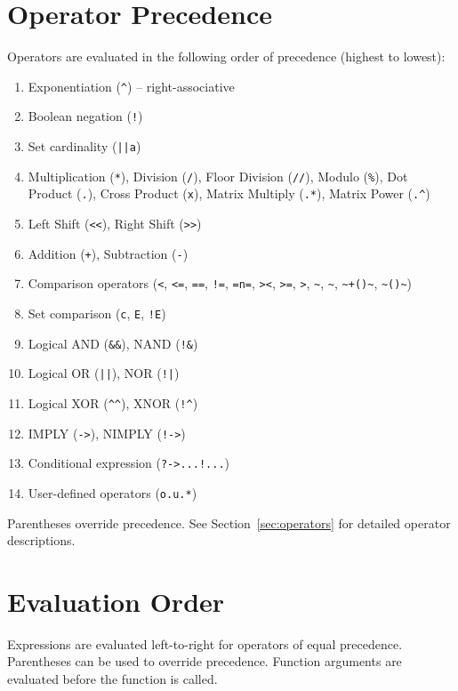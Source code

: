 \documentclass{report}
\begin{document}
\section{Operator Precedence}
Operators are evaluated in the following order of precedence (highest to lowest):
\begin{enumerate}
\item Exponentiation (\texttt{\^{}}) -- right-associative
\item Boolean negation (\texttt{!})
\item Set cardinality (\texttt{||a})
\item Multiplication (\texttt{*}), Division (\texttt{/}), Floor Division (\texttt{//}), Modulo (\texttt{\%}), Dot Product (\texttt{.}), Cross Product (\texttt{x}), Matrix Multiply (\texttt{.*}), Matrix Power (\texttt{.\^{}})
\item Left Shift (\texttt{<<}), Right Shift (\texttt{>>})
\item Addition (\texttt{+}), Subtraction (\texttt{-})
\item Comparison operators (\texttt{<}, \texttt{<=}, \texttt{==}, \texttt{!=}, \texttt{=n=}, \texttt{><}, \texttt{>=}, \texttt{>}, \texttt{\textasciitilde}, \texttt{\textasciitilde*}, \texttt{\textasciitilde+()\textasciitilde}, \texttt{\textasciitilde*()\textasciitilde})
\item Set comparison (\texttt{c}, \texttt{E}, \texttt{!E})
\item Logical AND (\texttt{\&\&}), NAND (\texttt{!\&})
\item Logical OR (\texttt{||}), NOR (\texttt{!|})
\item Logical XOR (\texttt{\^{}}\texttt{\^{}}), XNOR (\texttt{!}\texttt{\^{}})
\item IMPLY (\texttt{->}), NIMPLY (\texttt{!->})
\item Conditional expression (\texttt{?->...!...})
\item User-defined operators (\texttt{o.u.*})
\end{enumerate}

Parentheses override precedence. See Section~\ref{sec:operators} for detailed operator descriptions.

\section{Evaluation Order}
Expressions are evaluated left-to-right for operators of equal precedence. Parentheses can be used to override precedence. Function arguments are evaluated before the function is called.
\end{document}
